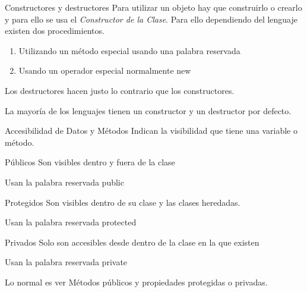 \documentclass[t]{beamer}
\begin{document}
\begin{frame}[label={sec:org19b1a4d}]{Constructores y destructores}
Para utilizar un objeto hay que construirlo o crearlo y para ello se usa el \emph{Constructor de la Clase}. Para ello dependiendo del lenguaje existen dos procedimientos. 

\begin{enumerate}
\item Utilizando un método especial usando una \alert{palabra reservada}
\item Usando un operador especial normalmente \alert{new}
\end{enumerate}

Los \alert{destructores} hacen justo lo contrario que los constructores. 


La mayoría de los lenguajes tienen un constructor y un destructor \alert{por defecto}.
\end{frame}

\begin{frame}[label={sec:orgb762c82}]{Accesibilidad de Datos y Métodos}
Indican la \alert{visibilidad} que tiene una variable o método. 

\begin{block}{Públicos}
Son visibles dentro y fuera de la clase

Usan la palabra reservada \alert{public}
\end{block}

\begin{block}{Protegidos}
Son visibles dentro de su clase y las clases heredadas.

Usan la palabra reservada \alert{protected}
\end{block}


\begin{block}{Privados}
Solo son accesibles desde dentro de la clase en la que existen 

Usan la palabra reservada \alert{private} 



Lo normal es ver \alert{Métodos públicos} y \alert{propiedades protegidas o privadas}. 
\end{block}
\end{frame}
\end{document}
